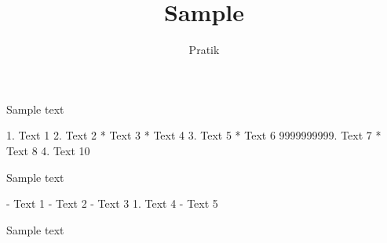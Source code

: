 \documentclass[12pt]{article}
\begin{document}
\title{Sample}
\author{Pratik}\maketitle

Sample text

1. Text 1
2. Text 2
	* Text 3
	* Text 4
3. Text 5
	* Text 6
		9999999999. Text 7
	* Text 8
4. Text 10

Sample text

- Text 1
- Text 2
- Text 3
	1. Text 4
- Text 5

Sample text
\end{document}
